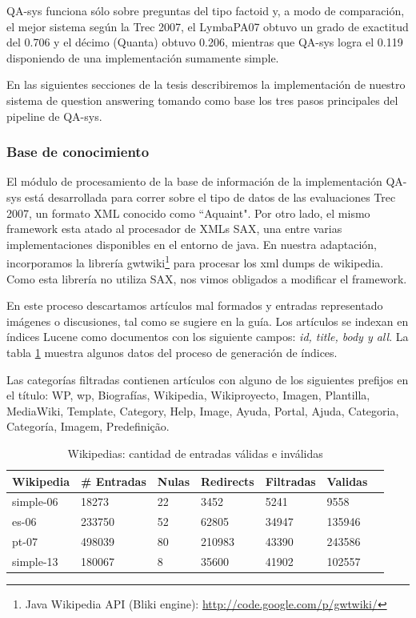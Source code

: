 QA-sys funciona sólo sobre preguntas del tipo
factoid y, a modo de comparación, el mejor sistema según la Trec
2007, el LymbaPA07 obtuvo un grado de exactitud del 0.706 y el décimo
(Quanta) obtuvo 0.206, mientras que QA-sys logra el 0.119 disponiendo de una implementación sumamente simple.

En las siguientes secciones de la tesis describiremos la implementación de nuestro sistema de question answering tomando como base los tres pasos principales del pipeline de QA-sys.

\subsubsection{Base de conocimiento}

El módulo de procesamiento de la base de información de la implementación QA-sys está desarrollada para correr sobre el tipo de datos de las evaluaciones Trec 2007, un formato XML conocido como ``Aquaint". Por otro lado, el mismo framework esta atado al procesador de XMLs SAX, una entre varias implementaciones disponibles en el entorno de java. En nuestra adaptación, incorporamos la librería gwtwiki\footnote{Java Wikipedia API (Bliki engine): \url{http://code.google.com/p/gwtwiki/}} para procesar los xml dumps de wikipedia. Como esta librería no utiliza SAX, nos vimos obligados a modificar el framework.

En este proceso descartamos artículos mal formados y entradas representado imágenes o discusiones, tal como se sugiere en la guía.
Los artículos se indexan en índices Lucene como documentos con los siguiente campos: \emph{id, title, body y all}.
La tabla \ref{table:creacion-indices} muestra algunos datos del proceso de generación de índices.

Las categorías filtradas contienen artículos con alguno de los siguientes prefijos en el título: WP, wp, Biografías, Wikipedia, Wikiproyecto, Imagen, Plantilla, MediaWiki, Template, Category, Help, Image, Ayuda, Portal, Ajuda, Categoria, Categoría, Imagem, Predefinição.


\begin{table}
\centering
\begin{center}
\begin{tabular}{| l | l | l | l | l | l| l|}
\hline
Wikipedia & \# Entradas & Nulas & Redirects & Filtradas & Validas \\ \hline
simple-06 & 18273 & 22 &  3452 & 5241 & 9558  \\ \hline
es-06 & 233750 & 52 & 62805 & 34947 & 135946 \\ \hline
pt-07 & 498039 & 80 & 210983 & 43390 & 243586 \\ \hline
simple-13 & 180067 & 8 & 35600 & 41902 & 102557\\ \hline
\end{tabular}
\caption{Wikipedias: cantidad de entradas válidas e inválidas}
\label{table:creacion-indices}
\end{center}
\end{table}

